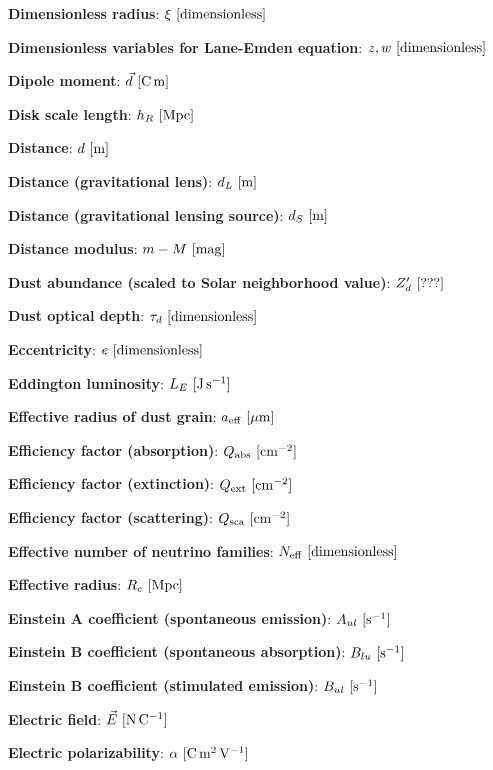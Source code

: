 \documentclass[a4paper,10pt]{article}
\begin{document}
{\noindent}\textbf{Dimensionless radius}: $\xi ~ [{\rm dimensionless}]$

{\noindent}\textbf{Dimensionless variables for Lane-Emden equation}: $z, w ~ [{\rm dimensionless}]$

{\noindent}\textbf{Dipole moment}: $\vec{d} ~ [{\rm C\,m}]$

{\noindent}\textbf{Disk scale length}: $h_R ~ [{\rm Mpc}]$

{\noindent}\textbf{Distance}: $d ~ [{\rm m}]$

{\noindent}\textbf{Distance (gravitational lens)}: $d_L ~ [{\rm m}]$

{\noindent}\textbf{Distance (gravitational lensing source)}: $d_S ~ [{\rm m}]$

{\noindent}\textbf{Distance modulus}: $m - M ~ [{\rm mag}]$

{\noindent}\textbf{Dust abundance (scaled to Solar neighborhood value)}: $Z_d' ~ [{\rm ???}]$

{\noindent}\textbf{Dust optical depth}: $\tau_d ~ [{\rm dimensionless}]$

{\noindent}\textbf{Eccentricity}: $e ~ [{\rm dimensionless}]$

{\noindent}\textbf{Eddington luminosity}: $L_E ~ [{\rm J\,s^{-1}}]$

{\noindent}\textbf{Effective radius of dust grain}: $a_{\rm eff} ~ [{\rm \mu m}]$

{\noindent}\textbf{Efficiency factor (absorption)}: $Q_{\rm abs} ~ [{\rm cm^{-2}}]$

{\noindent}\textbf{Efficiency factor (extinction)}: $Q_{\rm ext} ~ [{\rm cm^{-2}}]$

{\noindent}\textbf{Efficiency factor (scattering)}: $Q_{\rm sca} ~ [{\rm cm^{-2}}]$

{\noindent}\textbf{Effective number of neutrino families}: $N_\mathrm{eff} ~ [{\rm dimensionless}]$

{\noindent}\textbf{Effective radius}: $R_e ~ [{\rm Mpc}]$

{\noindent}\textbf{Einstein A coefficient (spontaneous emission)}: $A_{ul} ~ [{\rm s^{-1}}]$

{\noindent}\textbf{Einstein B coefficient (spontaneous absorption)}: $B_{lu} ~ [{\rm s^{-1}}]$

{\noindent}\textbf{Einstein B coefficient (stimulated emission)}: $B_{ul} ~ [{\rm s^{-1}}]$

{\noindent}\textbf{Electric field}: $\vec{E} ~ [{\rm N\,C^{-1}}]$

{\noindent}\textbf{Electric polarizability}: $\alpha ~ [{\rm C\,m^2\,V^{-1}}]$
\end{document}
